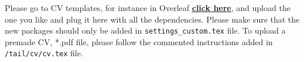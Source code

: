 \documentclass[../../main.tex]{subfiles}
\begin{document}
Please go to CV templates, for instance in Overleaf \href{https://www.overleaf.com/gallery/tagged/cv}{\textbf{click here}}, and upload the one you like and plug it here with all the dependencies. Please make sure that the new packages should only be added in \verb|settings_custom.tex| file. To upload a premade CV, *.pdf file, please follow the commented instructions added in \verb|/tail/cv/cv.tex| file.
\end{document}
